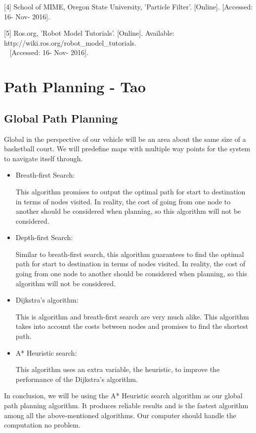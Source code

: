 \documentclass[compsoc,draftclsnofoot,onecolumn,10pt]{IEEEtran}
\begin{document}
[4] School of MIME, Oregon State University, 'Particle Filter'. [Online].
[Accessed: 16- Nov- 2016].\par

[5] Ros.org, 'Robot Model Tutorials'. [Online].
Available: http://wiki.ros.org/robot\_model\_tutorials.\\~
[Accessed: 16- Nov- 2016].\par

\newpage

\section{Path Planning - Tao}
\subsection{Global Path Planning}
Global in the perspective of our vehicle will be an area about the same size of a 
basketball court. We will predefine maps with multiple way points for the system to 
navigate itself through.\par
\begin{itemize}
\item Breath-first Search:\par
This algorithm promises to output the optimal path for start to destination in terms 
of nodes visited. In reality, the cost of going from one node to another should be 
considered when planning, so this algorithm will not be considered. 
\item Depth-first Search:\par
Similar to breath-first search, this algorithm guarantees to find the optimal path 
for start to destination in terms of nodes visited. In reality, the cost of going 
from one node to another should be considered when planning, so this algorithm will 
not be considered. 
\item Dijkstra's algorithm:\par
This is algorithm and breath-first search are very much alike. This algorithm takes 
into account the costs between nodes and promises to find the shortest path.
\item A* Heuristic search:\par
This algorithm uses an extra variable, the heuristic, to improve the performance 
of the Dijkstra's algorithm. 
\end{itemize}
In conclusion, we will be using the A* Heuristic search algorithm as our global 
path planning algorithm. It produces reliable results and is the fastest algorithm 
among all the above-mentioned algorithms. Our computer should handle the computation 
no problem.\par  
\end{document}
